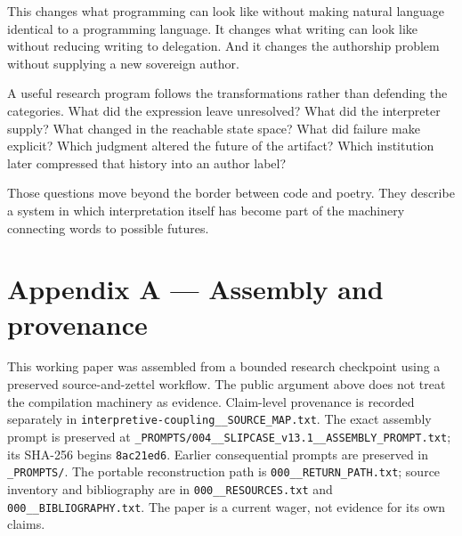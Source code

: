 \documentclass[11pt]{article}
\begin{document}
This changes what programming can look like without making natural language identical to a programming language. It changes what writing can look like without reducing writing to delegation. And it changes the authorship problem without supplying a new sovereign author.

A useful research program follows the transformations rather than defending the categories. What did the expression leave unresolved? What did the interpreter supply? What changed in the reachable state space? What did failure make explicit? Which judgment altered the future of the artifact? Which institution later compressed that history into an author label?

Those questions move beyond the border between code and poetry. They describe a system in which interpretation itself has become part of the machinery connecting words to possible futures.

\appendix
\section*{Appendix A --- Assembly and provenance}
This working paper was assembled from a bounded research checkpoint using a preserved source-and-zettel workflow. The public argument above does not treat the compilation machinery as evidence. Claim-level provenance is recorded separately in \texttt{interpretive-coupling\_\_SOURCE\_MAP.txt}. The exact assembly prompt is preserved at \texttt{\_PROMPTS/004\_\_SLIPCASE\_v13.1\_\_ASSEMBLY\_PROMPT.txt}; its SHA-256 begins \texttt{8ac21ed6}. Earlier consequential prompts are preserved in \texttt{\_PROMPTS/}. The portable reconstruction path is \texttt{000\_\_RETURN\_PATH.txt}; source inventory and bibliography are in \texttt{000\_\_RESOURCES.txt} and \texttt{000\_\_BIBLIOGRAPHY.txt}. The paper is a current wager, not evidence for its own claims.

\printbibliography
\end{document}
